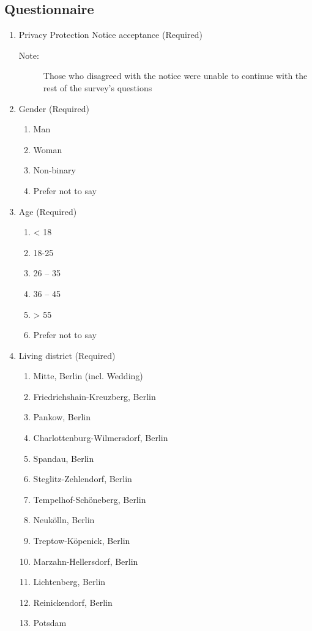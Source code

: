 \subsection{Questionnaire}
\begin{enumerate}
	\item Privacy Protection Notice acceptance (Required)
	\begin{description}
		\item[Note:] Those who disagreed with the notice were unable to continue with the rest of the survey's questions
	\end{description}
	\item Gender (Required)
	\begin{enumerate}
		\item Man
		\item Woman
		\item Non-binary
		\item Prefer not to say
	\end{enumerate}
	\item Age (Required)
	\begin{enumerate}
		\item < 18
		\item 18-25
		\item 26 – 35
		\item 36 – 45 
		\item > 55
		\item 	Prefer not to say
	\end{enumerate}
	\item Living district (Required)
	\begin{enumerate}
		\item Mitte, Berlin (incl. Wedding) 
		\item	Friedrichshain-Kreuzberg, Berlin
		\item 	Pankow, Berlin
		\item	Charlottenburg-Wilmersdorf, Berlin
		\item	Spandau, Berlin
		\item	Steglitz-Zehlendorf, Berlin
		\item	Tempelhof-Schöneberg, Berlin
		\item	Neukölln, Berlin
		\item	Treptow-Köpenick, Berlin
		\item	Marzahn-Hellersdorf, Berlin
		\item	Lichtenberg, Berlin
		\item	Reinickendorf, Berlin
		\item	Potsdam

\end{enumerate}
\end{enumerate}
